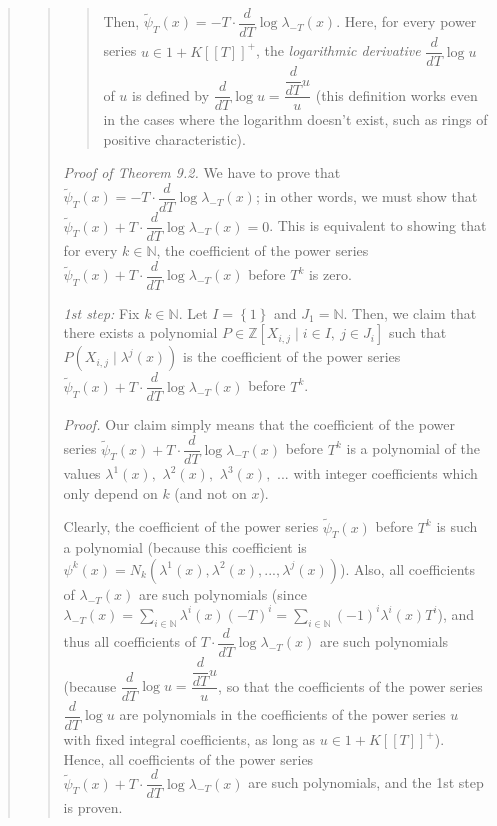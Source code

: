 \documentclass[12pt,final,notitlepage,onecolumn,german]{article}%
\begin{document}
\begin{quote}
\begin{quote}
\begin{quote}
Then, $\widetilde{\psi}_{T}\left(  x\right)  =-T\cdot\dfrac{d}{dT}\log
\lambda_{-T}\left(  x\right)  $. Here, for every power series $u\in1+K\left[
\left[  T\right]  \right]  ^{+}$, the \textit{logarithmic derivative}
$\dfrac{d}{dT}\log u$ of $u$ is defined by $\dfrac{d}{dT}\log u=\dfrac
{\dfrac{d}{dT}u}{u}$ (this definition works even in the cases where the
logarithm doesn't exist, such as rings of positive characteristic).
\end{quote}

\textit{Proof of Theorem 9.2.} We have to prove that $\widetilde{\psi}%
_{T}\left(  x\right)  =-T\cdot\dfrac{d}{dT}\log\lambda_{-T}\left(  x\right)
$; in other words, we must show that $\widetilde{\psi}_{T}\left(  x\right)
+T\cdot\dfrac{d}{dT}\log\lambda_{-T}\left(  x\right)  =0$. This is equivalent
to showing that for every $k\in\mathbb{N}$, the coefficient of the power
series $\widetilde{\psi}_{T}\left(  x\right)  +T\cdot\dfrac{d}{dT}\log
\lambda_{-T}\left(  x\right)  $ before $T^{k}$ is zero.

\textit{1st step:} Fix $k\in\mathbb{N}$. Let $I=\left\{  1\right\}  $ and
$J_{1}=\mathbb{N}$. Then, we claim that there exists a polynomial
$P\in\mathbb{Z}\left[  X_{i,j}\mid i\in I,\ j\in J_{i}\right]  $ such that
$P\left(  X_{i,j}\mid\lambda^{j}\left(  x\right)  \right)  $ is the
coefficient of the power series $\widetilde{\psi}_{T}\left(  x\right)
+T\cdot\dfrac{d}{dT}\log\lambda_{-T}\left(  x\right)  $ before $T^{k}$.

\textit{Proof.} Our claim simply means that the coefficient of the power
series $\widetilde{\psi}_{T}\left(  x\right)  +T\cdot\dfrac{d}{dT}\log
\lambda_{-T}\left(  x\right)  $ before $T^{k}$ is a polynomial of the values
$\lambda^{1}\left(  x\right)  ,$ $\lambda^{2}\left(  x\right)  ,$ $\lambda
^{3}\left(  x\right)  ,$ $...$ with integer coefficients which only depend on
$k$ (and not on $x$).

Clearly, the coefficient of the power series $\widetilde{\psi}_{T}\left(
x\right)  $ before $T^{k}$ is such a polynomial (because this coefficient is
$\psi^{k}\left(  x\right)  =N_{k}\left(  \lambda^{1}\left(  x\right)
,\lambda^{2}\left(  x\right)  ,...,\lambda^{j}\left(  x\right)  \right)  $).
Also, all coefficients of $\lambda_{-T}\left(  x\right)  $ are such
polynomials (since $\lambda_{-T}\left(  x\right)  =\sum\limits_{i\in
\mathbb{N}}\lambda^{i}\left(  x\right)  \left(  -T\right)  ^{i}=\sum
\limits_{i\in\mathbb{N}}\left(  -1\right)  ^{i}\lambda^{i}\left(  x\right)
T^{i}$), and thus all coefficients of $T\cdot\dfrac{d}{dT}\log\lambda
_{-T}\left(  x\right)  $ are such polynomials (because $\dfrac{d}{dT}\log
u=\dfrac{\dfrac{d}{dT}u}{u}$, so that the coefficients of the power series
$\dfrac{d}{dT}\log u$ are polynomials in the coefficients of the power series
$u$ with fixed integral coefficients, as long as $u\in1+K\left[  \left[
T\right]  \right]  ^{+}$). Hence, all coefficients of the power series
$\widetilde{\psi}_{T}\left(  x\right)  +T\cdot\dfrac{d}{dT}\log\lambda
_{-T}\left(  x\right)  $ are such polynomials, and the 1st step is proven.


\end{quote}
\end{quote}
\end{document}
